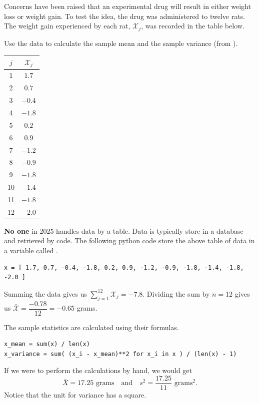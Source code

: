 \documentclass[../book.tex]{subfiles}
\begin{document}
\begin{example} \label{eg:sample-stats}
Concerns have been raised that an experimental drug will result in either weight loss or weight gain. To test the idea, the drug was administered to twelve rats. The weight gain experienced by each rat, \(\mathcal{X}_j\), was recorded in the table below.

Use the data to calculate the sample mean and the sample variance (from \cite{zar}).

\begin{center}
  \begin{tabular}{cc}
    \toprule
    \(j\) & \(\mathcal{X}_{j}\) \\
    \midrule
    1 & \( 1.7\) \\
    2 & \( 0.7\) \\
    3 & \(-0.4\) \\
    4 & \(-1.8\) \\
    5 & \( 0.2\) \\
    6 & \( 0.9\) \\
    7 & \(-1.2\) \\
    8 & \(-0.9\) \\
    9 & \(-1.8\) \\
    10 & \(-1.4\) \\
    11 & \(-1.8\) \\
    12 & \(-2.0\) \\
    \bottomrule
  \end{tabular}
\end{center}

\textbf{No one} in 2025 handles data by a table. Data is typically store in a database and retrieved by code. The following python code store the above table of data in a variable called .

\begin{verbatim}
x = [ 1.7, 0.7, -0.4, -1.8, 0.2, 0.9, -1.2, -0.9, -1.8, -1.4, -1.8, -2.0 ]
\end{verbatim}
\end{example}

\begin{solution}
Summing the data gives us \(\displaystyle\sum_{j=1}^{12} \mathcal{X}_j = -7.8\). Dividing the sum by \(n=12\) gives us \(\bar{\mathcal{X}}=\dfrac{-0.78}{12} =-0.65\) grams.

The sample statistics are calculated using their formulas.

\begin{verbatim}
x_mean = sum(x) / len(x)
x_variance = sum( (x_i - x_mean)**2 for x_i in x ) / (len(x) - 1)
\end{verbatim}

If we were to perform the calculations by hand, we would get
\begin{equation}\label{eq:rv-23}
\bar{X} = 17.25\text{ grams} \quad\text{and}\quad s^{2} = \frac{17.25}{11} \text{ grams}^{2}.
\end{equation}
Notice that the unit for variance has a square.
\end{solution}
\end{document}
